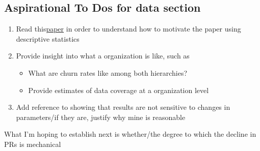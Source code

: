 \documentclass[12pt,notitlepage]{article}
\begin{document}

\subsection{Aspirational To Dos for data section }
\begin{enumerate}
\item Read this\href{https://pubs.aeaweb.org/doi/pdfplus/10.1257/jep.36.3.211}{paper} in order to understand how to motivate the paper using descriptive statistics
\item Provide insight into what a organization is like, such as
\begin{itemize}
\item What are churn rates like among both hierarchies?
\item Provide estimates of data coverage at a organization level 
\end{itemize}
\item Add reference to showing that results are not sensitive to changes in parameters/if they are, justify why mine is reasonable 
\end{enumerate}

What I'm hoping to establish next is whether/the degree to which the decline in PRs is mechanical
\end{document}
